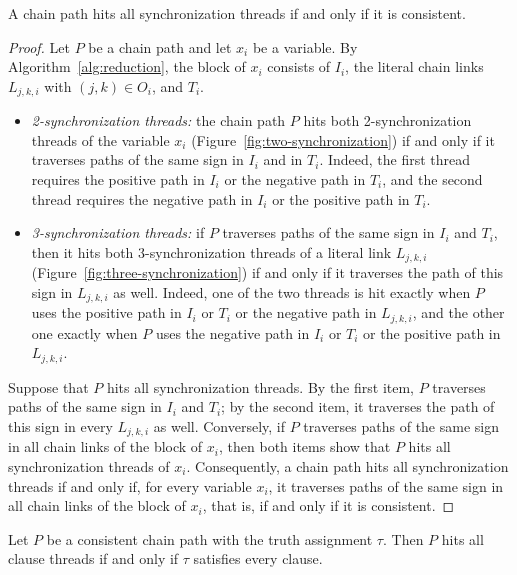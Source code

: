 \begin{lemma}[Synchronization]
\label{lem:synchronization}
A chain path hits all synchronization threads if and only if it is consistent.
\end{lemma}

\begin{proof}
Let $P$ be a chain path and let $x_i$ be a variable.
By Algorithm~\ref{alg:reduction}, the block of $x_i$ consists of $I_i$, the literal chain links $L_{j,k,i}$ with $(j,k) \in O_i$, and $T_i$.
\begin{itemize}
    \item \emph{2-synchronization threads:} the chain path $P$ hits both 2-synchronization threads of the variable $x_i$ (Figure~\ref{fig:two-synchronization}) if and only if it traverses paths of the same sign in $I_i$ and in $T_i$.
    Indeed, the first thread requires the positive path in $I_i$ or the negative path in $T_i$, and the second thread requires the negative path in $I_i$ or the positive path in $T_i$.
    \item \emph{3-synchronization threads:} if $P$ traverses paths of the same sign in $I_i$ and $T_i$, then it hits both 3-synchronization threads of a literal link $L_{j,k,i}$ (Figure~\ref{fig:three-synchronization}) if and only if it traverses the path of this sign in $L_{j,k,i}$ as well.
    Indeed, one of the two threads is hit exactly when $P$ uses the positive path in $I_i$ or $T_i$ or the negative path in $L_{j,k,i}$, and the other one exactly when $P$ uses the negative path in $I_i$ or $T_i$ or the positive path in $L_{j,k,i}$.
\end{itemize}
Suppose that $P$ hits all synchronization threads.
By the first item, $P$ traverses paths of the same sign in $I_i$ and $T_i$; by the second item, it traverses the path of this sign in every $L_{j,k,i}$ as well.
Conversely, if $P$ traverses paths of the same sign in all chain links of the block of $x_i$, then both items show that $P$ hits all synchronization threads of $x_i$.
Consequently, a chain path hits all synchronization threads if and only if, for every variable $x_i$, it traverses paths of the same sign in all chain links of the block of $x_i$, that is, if and only if it is consistent.
\end{proof}

\begin{lemma}
\label{lem:clause-threads}
Let $P$ be a consistent chain path with the truth assignment $\tau$.
Then $P$ hits all clause threads if and only if $\tau$ satisfies every clause.
\end{lemma}

